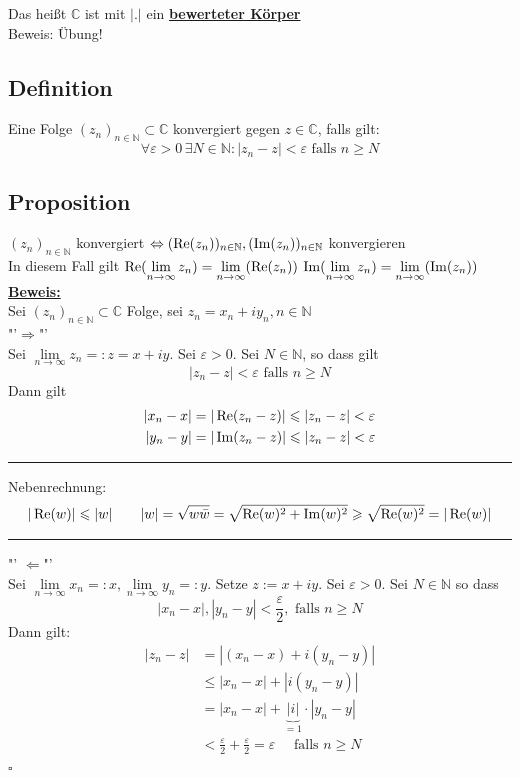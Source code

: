 Das heißt $\mathds{C}$ ist mit $|.|$ ein \underline{\textbf{bewerteter Körper}} \\
Beweis: Übung!

\subsection{Definition} %
\label{sub:definition}
Eine Folge $(z_n)_{n \in \mathds{N}} \subset \mathds{C}$ konvergiert gegen $z \in \mathds{C}$, falls gilt:
\[
	\forall \varepsilon >0  \, \exists N \in \mathds{N} : |z_n -z| < \varepsilon \text{ falls } n \ge N
\]

\subsection{Proposition} %
\label{sub:proposition}
$(z_n)_{n \in \mathds{N}}$ konvergiert $\Leftrightarrow (\operatorname{Re} (z_n))_{n \in \mathbb{N}} , ( \operatorname{Im} ({z_n}))_{n \in \mathbb{N}}$ konvergieren
\vspace{10pt} \\
In diesem Fall gilt $\operatorname{Re}(\lim\limits_{n \to \infty} z_n) = \lim\limits_{n \to \infty} ({\operatorname{Re} (z_n)})$ \quad 
$\operatorname{Im}(\lim\limits_{n \to \infty} z_n) = \lim\limits_{n \to \infty} ({\operatorname{Im} (z_n)})$
\vspace{10pt} \\
\underline{\textbf{Beweis:}} \\
Sei $(z_n)_{n \in \mathds{N}} \subset \mathds{C}$ Folge, sei $z_n = x_n + i y_n , n \in \mathds{N} $ 
\vspace{10pt} \\
"'$\Rightarrow $"' \\
Sei $\lim\limits_{n \to \infty} z_n =: z = x +i y$. Sei $\varepsilon >0$. Sei $N \in \mathds{N}$, so dass gilt
\[
	|z_n -z| < \varepsilon \text{ falls } n \ge N 
\]
Dann gilt
\begin{align*}
	|x_n -x| &= | \operatorname{Re} (z_n -z)| \leqslant | z_n -z | < \varepsilon \\
	|y_n -y| &= | \operatorname{Im} (z_n -z) | \leqslant | z_n -z | < \varepsilon
\end{align*}
\hrule 
Nebenrechnung:
\[
	| \operatorname{Re} (w)| \leqslant |w| \qquad |w| = \sqrt{w \bar w}  = \sqrt{\operatorname{Re} (w)^2 + \operatorname{Im}(w)^2} \geqslant \sqrt{\operatorname{Re} (w)^2} = | \operatorname{Re} (w)|
\]
\hrule 
\vspace{10pt} 
"' $\Leftarrow$"' \\
Sei $\lim\limits_{n \to \infty} x_n =: x , \lim\limits_{n \to \infty} y_n =: y$. Setze $z:= x+iy$. Sei $\varepsilon >0$. Sei $N \in \mathds{N}$ so dass
\[
	|x_n -x| , |y_n -y| < \frac{\varepsilon}{2} , \text{ falls } n \ge N 
\]
Dann gilt:
\begin{align*}
	|z_n -z| &= |(x_n -x) + i (y_n -y)| \\
	&\le |x_n -x| + | i (y_n -y)|  \tag{Dreiecksungleichung}\\
	&= |x_n -x | + \underbrace{|i|}_{=1} \cdot |y_n -y| \\
	&< \frac{\varepsilon}{2}+ \frac{\varepsilon}{2}  = \varepsilon \quad \text{ falls } n \ge N
\end{align*}
\hfill \( \square \)

